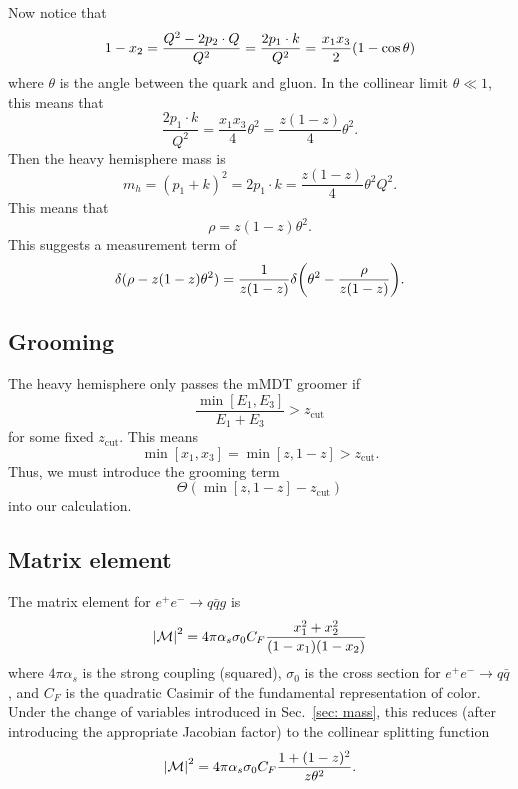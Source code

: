 \documentclass[11pt,twoside,reqno]{amsart}
\theoremstyle{plain}
\theoremstyle{remark}
\theoremstyle{definition}
\theoremstyle{remark}
\theoremstyle{definition}
\theoremstyle{definition}
\newcommand{\cM}{\mathcal{M}}
\newcommand{\zcut}{z_\mathrm{cut}}
\begin{document}
	Now notice that
	\begin{equation}
		1 - x_2 = \frac{Q^2 - 2 p_2 \cdot Q}{Q^2} = \frac{2 p_1 \cdot k}{Q^2} = \frac{x_1 x_3}{2}\qty(1 - \cos \theta)
	\end{equation}
	where $\theta$ is the angle between the quark and gluon. In the collinear limit $\theta \ll 1$, this means that
	\begin{equation}
		\frac{2 p_1 \cdot k}{Q^2} = \frac{x_1 x_3}{4}\theta^2 = \frac{z(1 - z)}{4}\theta^2.
	\end{equation}
	Then the heavy hemisphere mass is
	\begin{equation}
		m_h = (p_1 + k)^2 = 2p_1 \cdot k = \frac{z(1 - z)}{4}\theta^2 Q^2.
	\end{equation}
	This means that
	\begin{equation}
		\rho = z(1 - z)\theta^2.
	\end{equation}
	This suggests a measurement term of
	\begin{equation}\label{eq:measurement}
		\delta(\rho - z(1 - z)\theta^2) = \frac{1}{z(1 - z)} \delta\qty(\theta^2 - \frac{\rho}{z(1 - z)}).
	\end{equation}


\subsection{Grooming}

	The heavy hemisphere only passes the mMDT groomer if \cite{kardos_two-_2020}
	\begin{equation}
		\frac{\min[E_1, E_3]}{E_1 + E_3} > \zcut
	\end{equation}
	for some fixed $\zcut$. This means
	\begin{equation}
		\min[x_1, x_3] = \min[z, 1 - z] > \zcut.
	\end{equation}
	Thus, we must introduce the grooming term
	\begin{equation}\label{eq: grooming}
		\Theta(\min[z, 1 - z] - \zcut)
	\end{equation}
	into our calculation.
	

\subsection{Matrix element}

	The matrix element for $e^+ e^- \to q \bar q g$ is \cite{larkoski_improving_2020}
	\begin{equation}\label{eq:matrix element}
		\abs{\cM}^2 = 4 \pi \alpha_s \sigma_0 C_F \frac{x_1^2 + x_2^2}{(1 - x_1)(1 - x_2)}
	\end{equation}
	where $4\pi\alpha_s$ is the strong coupling (squared), $\sigma_0$ is the cross section for $e^+ e^- \to q \bar q$, and $C_F$ is the quadratic Casimir of the fundamental representation of color. Under the change of variables introduced in Sec.\ \ref{sec: mass}, this reduces (after introducing the appropriate Jacobian factor) to the collinear splitting function
	\begin{equation}
		\abs{\cM}^2 = 4 \pi \alpha_s \sigma_0 C_F \frac{1 + (1 - z)^2}{z \theta^2}.
	\end{equation}
\end{document}
